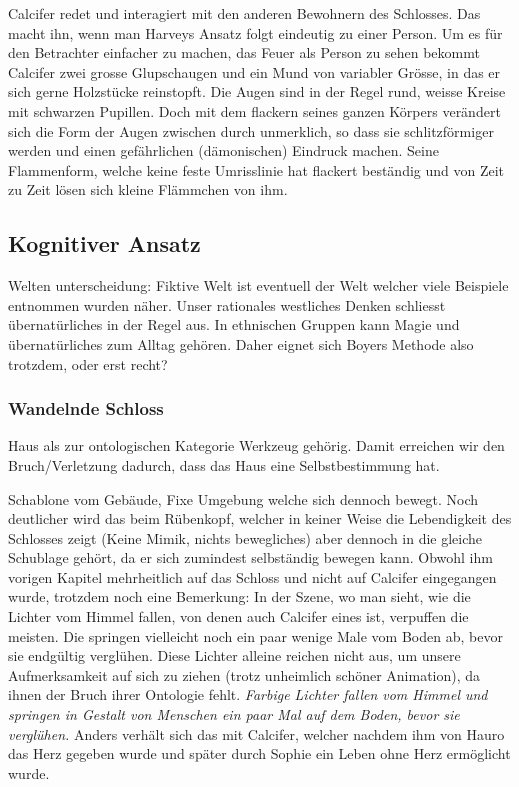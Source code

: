 Calcifer redet und interagiert mit den anderen Bewohnern des Schlosses. Das macht ihn, wenn man Harveys Ansatz folgt eindeutig zu einer Person. Um es für den Betrachter einfacher zu machen, das Feuer als Person zu sehen bekommt Calcifer zwei grosse Glupschaugen und ein Mund von variabler Grösse, in das er sich gerne Holzstücke reinstopft. Die Augen sind in der Regel rund, weisse Kreise mit schwarzen Pupillen. Doch mit dem flackern seines ganzen Körpers verändert sich die Form der Augen zwischen durch unmerklich, so dass sie schlitzförmiger werden und einen gefährlichen (dämonischen) Eindruck machen. Seine Flammenform, welche keine feste Umrisslinie hat flackert beständig und von Zeit zu Zeit lösen sich kleine Flämmchen von ihm.

\subsection{Kognitiver Ansatz}
Welten unterscheidung: Fiktive Welt ist eventuell der Welt welcher viele Beispiele entnommen wurden näher. Unser rationales westliches Denken schliesst übernatürliches in der Regel aus. In ethnischen Gruppen kann Magie und übernatürliches zum Alltag gehören. Daher eignet sich Boyers Methode also trotzdem, oder erst recht?

\subsubsection*{Wandelnde Schloss}
Haus als zur ontologischen Kategorie Werkzeug gehörig. Damit erreichen wir den Bruch/Verletzung dadurch, dass das Haus eine Selbstbestimmung hat.

Schablone vom Gebäude, Fixe Umgebung welche sich dennoch bewegt. Noch deutlicher wird das beim Rübenkopf, welcher in keiner Weise die Lebendigkeit des Schlosses zeigt (Keine Mimik, nichts bewegliches) aber dennoch in die gleiche Schublage gehört, da er sich zumindest selbständig bewegen kann.
Obwohl ihm vorigen Kapitel mehrheitlich auf das Schloss und nicht auf Calcifer eingegangen wurde, trotzdem noch eine Bemerkung: In der Szene, wo man sieht, wie die Lichter vom Himmel fallen, von denen auch Calcifer eines ist, verpuffen die meisten. Die springen vielleicht noch ein paar wenige Male vom Boden ab, bevor sie endgültig verglühen. Diese Lichter alleine reichen nicht aus, um unsere Aufmerksamkeit auf sich zu ziehen (trotz unheimlich schöner Animation), da ihnen der Bruch ihrer Ontologie fehlt. \emph{Farbige Lichter fallen vom Himmel und springen in Gestalt von Menschen ein paar Mal auf dem Boden, bevor sie verglühen.} Anders verhält sich das mit Calcifer, welcher nachdem ihm von Hauro das Herz gegeben wurde und später durch Sophie ein Leben ohne Herz ermöglicht wurde.

